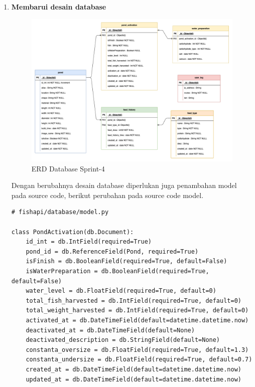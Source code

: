 \begin{enumerate}[1.]



\item \textbf{Membarui desain database}

\begin{figure}[H]
	\centering
	\includegraphics[height=0.7\textwidth]{gambar/Sprint04/diagram database/database}
	\caption{ERD Database Sprint-4}
	\label{fig:database_sprint4}
\end{figure}

Dengan berubahnya desain database diperlukan juga penambahan model pada source code, berikut perubahan pada source code model.

\begin{lstlisting}
# fishapi/database/model.py

class PondActivation(db.Document):
    id_int = db.IntField(required=True)
    pond_id = db.ReferenceField(Pond, required=True)
    isFinish = db.BooleanField(required=True, default=False)
    isWaterPreparation = db.BooleanField(required=True, default=False)
    water_level = db.FloatField(required=True, default=0)
    total_fish_harvested = db.IntField(required=True, default=0)
    total_weight_harvested = db.IntField(required=True, default=0)
    activated_at = db.DateTimeField(default=datetime.datetime.now)
    deactivated_at = db.DateTimeField(default=None)
    deactivated_description = db.StringField(default=None)
    constanta_oversize = db.FloatField(required=True, default=1.3)
    constanta_undersize = db.FloatField(required=True, default=0.7)
    created_at = db.DateTimeField(default=datetime.datetime.now)
    updated_at = db.DateTimeField(default=datetime.datetime.now)
\end{lstlisting}




\end{enumerate}

